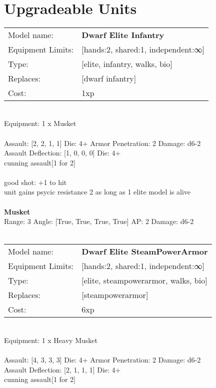  
\ \\













\section{Upgradeable Units}\noindent
\begin{tabular}{ll}
Model name: &{\bf Dwarf Elite Infantry } \\
Equipment Limits: &[hands:2, shared:1, independent:∞] \\
Type: &[elite, infantry, walks, bio] \\
Replaces: &[dwarf infantry] \\
Cost: & 1xp\\
\end{tabular}
\ \\
Equipment: 1 x Musket \\
\ \\
Assault: [2, 2, 1, 1] Die: 4+ Armor Penetration: 2 Damage: d6-2 \\
Assault Deflection: [1, 0, 0, 0] Die: 4+\\
\indent cunning assault[1 for 2]\\ 
 
\ \\
good shot: +1 to hit\\ 
unit gains psycic resistance 2 as long as 1 elite model is alive\\ 

\ \\
{\bf Musket } \\



Range: 3  Angle: [True, True, True, True] AP: 2 Damage: d6-2 \\




 
\ \\

\noindent
\begin{tabular}{ll}
Model name: &{\bf Dwarf Elite SteamPowerArmor } \\
Equipment Limits: &[hands:2, shared:1, independent:∞] \\
Type: &[elite, steampowerarmor, walks, bio] \\
Replaces: &[steampowerarmor] \\
Cost: & 6xp\\
\end{tabular}
\ \\
Equipment: 1 x Heavy Musket \\
\ \\
Assault: [4, 3, 3, 3] Die: 4+ Armor Penetration: 2 Damage: d6-2 \\
Assault Deflection: [2, 1, 1, 1] Die: 4+\\
\indent cunning assault[1 for 2]\\ 
 
